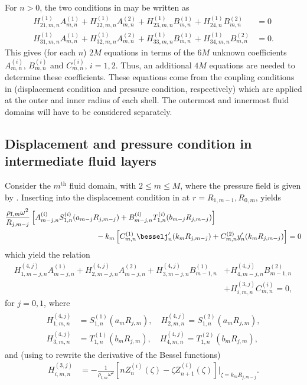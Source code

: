 For $n>0$, the two conditions in  may be written as
\begin{align}
	H_{21,m,n}^{(1)}A_{m,n}^{(1)} + H_{22,m,n}^{(1)}A_{m,n}^{(2)} + H_{23,m,n}^{(1)}B_{m,n}^{(1)} + H_{24,n}^{(1)}B_{m,n}^{(2)} &= 0\\
	H_{31,m,n}^{(1)}A_{m,n}^{(1)} + H_{32,m,n}^{(1)}A_{m,n}^{(2)} + H_{33,m,n}^{(1)}B_{m,n}^{(1)} + H_{34,m,n}^{(1)}B_{m,n}^{(2)} &= 0.
\end{align}
This gives (for each $n$) $2M$ equations in terms of the $6M$ unknown coefficients $A_{m,n}^{(i)}$, $B_{m,n}^{(i)}$ and $C_{m,n}^{(i)}$, $i=1,2$. Thus, an additional $4M$ equations are needed to determine these coefficients. These equations come from the coupling conditions in  (displacement condition and pressure condition, respectively) which are applied at the outer and inner radius of each shell. The outermost and innermost fluid domains will have to be considered separately.

\subsection{Displacement and pressure condition in intermediate fluid layers}
Consider the $m^{\mathrm{th}}$ fluid domain, with $2\leq m\leq M$, where the pressure field is given by . Inserting  into the displacement condition in  at $r=R_{1,m-1},R_{0,m}$, yields
\begin{align*}
	&\frac{\rho_{\mathrm{f},m}\omega^2}{R_{j,m-j}}\left[A_{m-j,n}^{(i)} S_{1,n}^{(i)}(a_{m-j} R_{j,m-j}) + B_{m-j,n}^{(i)} T_{1,n}^{(i)}(b_{m-j} R_{j,m-j})\right] \\
	&{\hskip12em\relax} - k_m\left[C_{m,n}^{(1)}\besselj_n'(k_m R_{j,m-j}) + C_{m,n}^{(2)}y_n'(k_m R_{j,m-j})\right] = 0
\end{align*}
which yield the relation
\begin{align}
	H_{1,m-j,n}^{(4,j)}A_{m-j,n}^{(1)} + H_{2,m-j,n}^{(4,j)}A_{m-j,n}^{(2)} + H_{3,m-j,n}^{(4,j)}B_{m-1,n}^{(1)} &+ H_{4,m-j,n}^{(4,j)}B_{m-1,n}^{(2)}\nonumber\\ 
	&+ H_{i,m,n}^{(3,j)}C_{m,n}^{(i)} = 0,
\end{align}
for $j=0,1$, where
\begin{align}\label{Eq1:K4}
\begin{split}
	H_{1,m,n}^{(4,j)} &= S_{1,n}^{(1)}(a_m R_{j,m}),\quad H_{2,m,n}^{(4,j)} = S_{1,n}^{(2)}(a_m R_{j,m}),\\ H_{3,m,n}^{(4,j)} &= T_{1,n}^{(1)}(b_m R_{j,m}),\quad H_{4,m,n}^{(4,j)} = T_{1,n}^{(2)}(b_m R_{j,m}),
	\end{split}
\end{align}
and (using  to rewrite the derivative of the Bessel functions)
\begin{align}\label{Eq1:K3}
	H_{i,m,n}^{(3,j)} &= -\frac{1}{\rho_{\mathrm{f},m}\omega^2}\left[nZ_n^{(i)}(\zeta) - \zeta Z_{n+1}^{(i)}(\zeta)\right]\Big\vert_{\zeta=k_mR_{j,m-j}}.
\end{align}

